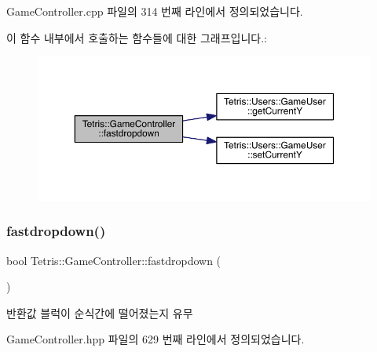 Game\+Controller.\+cpp 파일의 314 번째 라인에서 정의되었습니다.

이 함수 내부에서 호출하는 함수들에 대한 그래프입니다.\+:
\nopagebreak
\begin{figure}[H]
\begin{center}
\leavevmode
\includegraphics[width=350pt]{class_tetris_1_1_game_controller_a8d5b65ec7638519a39b4ba8a71e67fff_cgraph}
\end{center}
\end{figure}
\mbox{\label{class_tetris_1_1_game_controller_a8d5b65ec7638519a39b4ba8a71e67fff}} 
\subsubsection{\texorpdfstring{fastdropdown()}{fastdropdown()}\hspace{0.1cm}{\footnotesize\ttfamily [2/2]}}
{\footnotesize\ttfamily bool Tetris\+::\+Game\+Controller\+::fastdropdown (\begin{DoxyParamCaption}{ }\end{DoxyParamCaption})\hspace{0.3cm}{\ttfamily [inline]}}

\begin{DoxyReturn}{반환값}
블럭이 순식간에 떨어졌는지 유무 
\end{DoxyReturn}


Game\+Controller.\+hpp 파일의 629 번째 라인에서 정의되었습니다.

